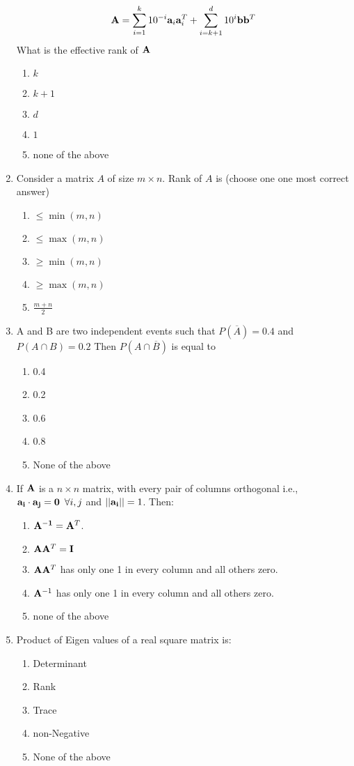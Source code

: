 \documentclass{article}
\begin{document}
\begin{enumerate}
    \[ {\bf A} = \sum_{i=1}^k 10^{-i} {\bf a}_i {\bf a}_i^T + \sum_{i=k+1}^d 10^{i}{\bf b}{\bf b}^T\]
    What is the effective rank of ${\bf A}$
    \begin{enumerate}
        \item $k$
        \item $k+1$
        \item $d$
        \item $1$
        \item none of the above
    \end{enumerate}

    \item Consider a matrix $A$ of size $m\times n$. Rank of $A$ is (choose one one most correct answer)
\begin{enumerate}
\item $\leq \min(m,n)$
\item $\leq \max (m,n)$
\item $\geq \min(m,n)$
\item $\geq \max(m,n)$
\item $\frac{m+n}{2}$
\end{enumerate}

\item A and B are two independent events such that $P(\overline A) = 0.4$ and $P(A \cap B) = 0.2$ Then $P(A \cap \overline B)$ is equal to
    \begin{enumerate}
        \item 0.4
        \item 0.2
        \item 0.6
        \item 0.8
        \item None of  the above
    \end{enumerate}

\item If ${\bf A}$ is a $n\times n$ matrix, with every pair of columns orthogonal i.e., ${\bf a_i\cdot a_j = 0}\,\,\, \forall i,j$ and $||{\bf a_i}|| = 1$. Then:
\begin{enumerate}
    \item ${\bf A^{-1}} = {\bf A}^T$.
    \item ${\bf A}{\bf A}^T = {\bf I}$
    \item ${\bf A}{\bf A}^T$ has only one 1 in every column and all others zero.
    \item ${\bf A}^{-1}$ has only one 1 in every column and all others zero.
    \item none of the above
\end{enumerate}
\item Product of Eigen values of a real square matrix is:
\begin{enumerate}
    \item Determinant
    \item Rank
    \item Trace
    \item non-Negative
    \item None of the above
\end{enumerate}


\end{enumerate}
\end{document}
